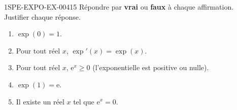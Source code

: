 \begin{exercice}{1SPE-EXPO-EX-004}{1}{5}
Répondre par \textbf{vrai} ou \textbf{faux} à chaque affirmation. Justifier chaque réponse.
\begin{enumerate}
\item $\exp(0) = 1$.
\item Pour tout réel $x$, $\exp'(x) = \exp(x)$.
\item Pour tout réel $x$, $\mathrm{e}^x \geqslant 0$ (l'exponentielle est positive ou nulle).
\item $\exp(1) = \mathrm{e}$.
\item Il existe un réel $x$ tel que $\mathrm{e}^x = 0$.
\end{enumerate}
\end{exercice}
